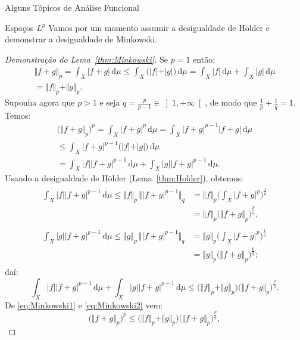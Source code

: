 \documentclass[oneside,final,11pt]{amsbook}
\newcommand{\dd}{\mathrm d}
\theoremstyle{remark}\newtheorem{exercise}{Exercício}[chapter]
\theoremstyle{remark}\newtheorem{*exercise}[exercise]{\hbox to 0pt{\hskip 0pt minus 1fil*}Exercício}
\theoremstyle{definition}\newtheorem{exdefin}{Definição}[chapter]
\theoremstyle{plain}\newtheorem{teo}{Teorema}[section]
\theoremstyle{plain}\newtheorem{lem}[teo]{Lema}
\theoremstyle{plain}\newtheorem{prop}[teo]{Proposição}
\theoremstyle{plain}\newtheorem{cor}[teo]{Corolário}
\theoremstyle{definition}\newtheorem{defin}[teo]{Definição}
\theoremstyle{remark}\newtheorem{rem}[teo]{Observação}
\theoremstyle{definition}\newtheorem{notation}[teo]{Notação}
\theoremstyle{definition}\newtheorem{convention}[teo]{Convenção}
\theoremstyle{definition}\newtheorem{example}[teo]{Exemplo}
\numberwithin{section}{chapter}
\numberwithin{equation}{section}
\begin{document}
\begin{chapter}{Alguns Tópicos de Análise Funcional}
\begin{section}[Espaços $L^p$]{Espaços ${L^p}$}
Vamos por um momento assumir a desigualdade de Hölder e demonstrar a desigualdade de Minkowski.
\begin{proof}[Demonstração do Lema~\ref{thm:Minkowski}]
Se $p=1$ então:
\begin{multline*}
\Vert f+g\Vert_p=\int_X\vert f+g\vert\,\dd\mu\le\int_X\big(\vert f\vert+\vert g\vert\big)\,\dd\mu
=\int_X\vert f\vert\,\dd\mu+\int_X\vert g\vert\,\dd\mu\\
=\Vert f\Vert_p+\Vert g\Vert_p.
\end{multline*}
Suponha agora que $p>1$ e seja $q=\frac p{p-1}\in\left]1,+\infty\right[$,
de modo que $\frac1p+\frac1q=1$. Temos:
\begin{multline}\label{eq:Minkowski1}
\big(\Vert f+g\Vert_p\big)^p=\int_X\vert f+g\vert^p\,\dd\mu=\int_X\vert f+g\vert^{p-1}\vert f+g\vert\,\dd\mu\\
\le\int_X\vert f+g\vert^{p-1}\big(\vert f\vert+\vert g\vert\big)\,\dd\mu\\
=\int_X\vert f\vert\vert f+g\vert^{p-1}\,\dd\mu+\int_X\vert g\vert\vert f+g\vert^{p-1}\,\dd\mu.
\end{multline}
Usando a desigualdade de Hölder (Lema~\ref{thm:Holder}), obtemos:
\begin{gather*}
\begin{aligned}
\int_X\vert f\vert\vert f+g\vert^{p-1}\,\dd\mu\le\Vert f\Vert_p\,\big\Vert\vert f+g\vert^{p-1}\big\Vert_q
&=\Vert f\Vert_p\Big(\int_X\vert f+g\vert^p\Big)^{\frac1q}\\
&=\Vert f\Vert_p\big(\Vert f+g\Vert_p\big)^{\frac pq},
\end{aligned}\\
\begin{aligned}
\int_X\vert g\vert\vert f+g\vert^{p-1}\,\dd\mu\le\Vert g\Vert_p\,\big\Vert\vert f+g\vert^{p-1}\big\Vert_q
&=\Vert g\Vert_p\Big(\int_X\vert f+g\vert^p\Big)^{\frac1q}\\
&=\Vert g\Vert_p\big(\Vert f+g\Vert_p\big)^{\frac pq};
\end{aligned}
\end{gather*}
daí:
\begin{equation}\label{eq:Minkowski2}
\int_X\vert f\vert\vert f+g\vert^{p-1}\,\dd\mu+\int_X\vert g\vert\vert f+g\vert^{p-1}\,\dd\mu
\le\big(\Vert f\Vert_p+\Vert g\Vert_p\big)\big(\Vert f+g\Vert_p\big)^{\frac pq}.
\end{equation}
De \eqref{eq:Minkowski1} e \eqref{eq:Minkowski2} vem:
\[\big(\Vert f+g\Vert_p\big)^p\le\big(\Vert f\Vert_p+\Vert g\Vert_p\big)\big(\Vert f+g\Vert_p\big)^{\frac pq},\]

\end{proof}
\end{section}
\end{chapter}
\end{document}
